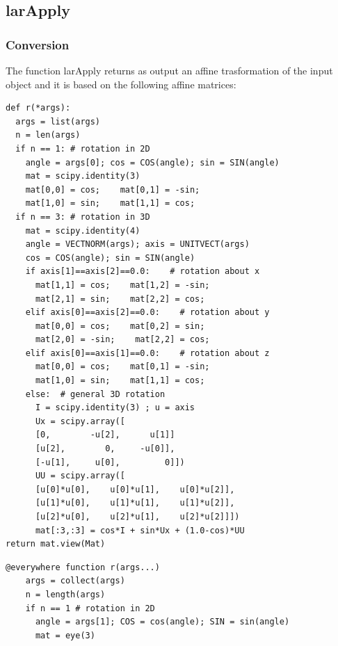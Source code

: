 \documentclass[a4paper,12pt]{article}
\begin{document}

\newpage
\subsection{larApply}
\subsubsection{Conversion}
The function larApply returns as output an affine trasformation of the input object and it is based on the following affine matrices:
\vspace{10px}

\noindent{}
\begin{multicols}{2}
\noindent {}
\begin{Verbatim}[fontsize=\scriptsize]
def r(*args):
  args = list(args)
  n = len(args)
  if n == 1: # rotation in 2D
    angle = args[0]; cos = COS(angle); sin = SIN(angle)
    mat = scipy.identity(3)
    mat[0,0] = cos;    mat[0,1] = -sin;
    mat[1,0] = sin;    mat[1,1] = cos;
  if n == 3: # rotation in 3D
    mat = scipy.identity(4)
    angle = VECTNORM(args); axis = UNITVECT(args)
    cos = COS(angle); sin = SIN(angle)
    if axis[1]==axis[2]==0.0:    # rotation about x
      mat[1,1] = cos;    mat[1,2] = -sin;
      mat[2,1] = sin;    mat[2,2] = cos;
    elif axis[0]==axis[2]==0.0:    # rotation about y
      mat[0,0] = cos;    mat[0,2] = sin;
      mat[2,0] = -sin;    mat[2,2] = cos;
    elif axis[0]==axis[1]==0.0:    # rotation about z
      mat[0,0] = cos;    mat[0,1] = -sin;
      mat[1,0] = sin;    mat[1,1] = cos;
    else:  # general 3D rotation
      I = scipy.identity(3) ; u = axis
      Ux = scipy.array([
	  [0,        -u[2],      u[1]]
	  [u[2],        0,     -u[0]],
	  [-u[1],     u[0],         0]])
      UU = scipy.array([
	  [u[0]*u[0],    u[0]*u[1],    u[0]*u[2]],
	  [u[1]*u[0],    u[1]*u[1],    u[1]*u[2]],
	  [u[2]*u[0],    u[2]*u[1],    u[2]*u[2]]])
	  mat[:3,:3] = cos*I + sin*Ux + (1.0-cos)*UU
return mat.view(Mat)
\end{Verbatim}
\columnbreak
{}
\begin{Verbatim}[fontsize=\scriptsize]
 @everywhere function r(args...)
    args = collect(args)
    n = length(args)
    if n == 1 # rotation in 2D
      angle = args[1]; COS = cos(angle); SIN = sin(angle)
      mat = eye(3)

\end{Verbatim}
\end{multicols}
\end{document}
